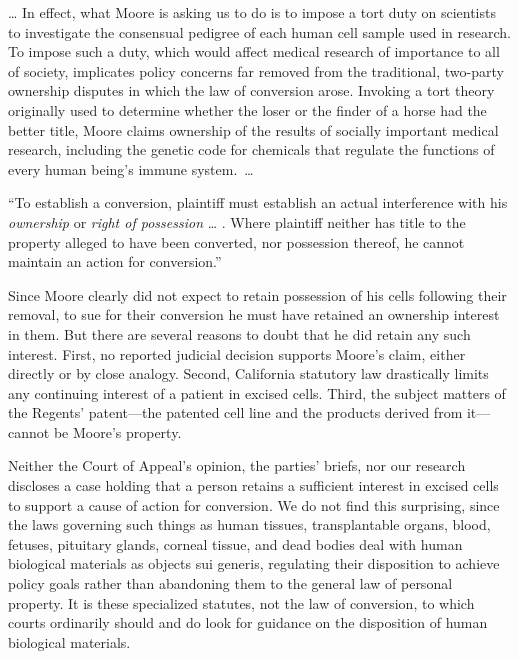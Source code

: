 {\dots} In effect, what Moore is asking us to do is to impose a tort duty on
scientists to investigate the consensual pedigree of each human cell sample
used in research. To impose such a duty, which would affect medical research of
importance to all of society, implicates policy concerns far removed from the
traditional, two-party ownership disputes in which the law of conversion arose.
Invoking a tort theory originally used to determine whether the loser or the
finder of a horse had the better title, Moore claims ownership of the results
of socially important medical research, including the genetic code for
chemicals that regulate the functions of every human being's immune
system.~{\dots}


 {}``To establish a conversion, plaintiff must establish an actual interference
with his \textit{ownership} or \textit{right of possession} {\dots} . Where
plaintiff neither has title to the property alleged to have been converted, nor
possession thereof, he cannot maintain an action for conversion.'' 

Since Moore clearly did not expect to retain possession of his cells following
their removal, to sue for their conversion he must have retained an ownership
interest in them. But there are several reasons to doubt that he did retain any
such interest. First, no reported judicial decision supports Moore's claim,
either directly or by close analogy. Second, California statutory law
drastically limits any continuing interest of a patient in excised cells.
Third, the subject matters of the Regents' patent---the patented cell line and
the products derived from it---cannot be Moore's property.

Neither the Court of Appeal's opinion, the parties' briefs, nor our research
discloses a case holding that a person retains a sufficient interest in excised
cells to support a cause of action for conversion. We do not find this
surprising, since the laws governing such things as human tissues,
transplantable organs, blood, fetuses, pituitary glands, corneal tissue, and dead
bodies deal with human biological materials as objects sui generis, regulating
their disposition to achieve policy goals rather than abandoning them to the
general law of personal property. It is these specialized statutes, not the law
of conversion, to which courts ordinarily should and do look for guidance on
the disposition of human biological materials.

